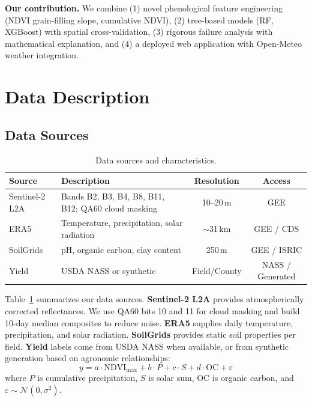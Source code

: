\documentclass[conference]{IEEEtran}
\begin{document}
\textbf{Our contribution.} We combine (1) novel phenological feature engineering (NDVI grain-filling slope, cumulative NDVI), (2) tree-based models (RF, XGBoost) with spatial cross-validation, (3) rigorous failure analysis with mathematical explanation, and (4) a deployed web application with Open-Meteo weather integration.

\section{Data Description}
\label{sec:data}

\subsection{Data Sources}

\begin{table}[t]
\centering
\caption{Data sources and characteristics.}
\label{tab:data_sources}
\begin{tabular}{@{}llcc@{}}
\toprule
Source & Description & Resolution & Access \\
\midrule
Sentinel-2 L2A & Bands B2, B3, B4, B8, B11, B12; QA60 cloud masking & 10--20\,m & GEE \\
ERA5 & Temperature, precipitation, solar radiation & $\sim$31\,km & GEE / CDS \\
SoilGrids & pH, organic carbon, clay content & 250\,m & GEE / ISRIC \\
Yield & USDA NASS or synthetic & Field/County & NASS / Generated \\
\bottomrule
\end{tabular}
\end{table}

Table~\ref{tab:data_sources} summarizes our data sources. \textbf{Sentinel-2 L2A} provides atmospherically corrected reflectances. We use QA60 bits 10 and 11 for cloud masking and build 10-day median composites to reduce noise. \textbf{ERA5} supplies daily temperature, precipitation, and solar radiation. \textbf{SoilGrids} provides static soil properties per field. \textbf{Yield} labels come from USDA NASS when available, or from synthetic generation based on agronomic relationships:
\begin{equation}
  y = a \cdot \text{NDVI}_{\max} + b \cdot P + c \cdot S + d \cdot \text{OC} + \varepsilon
\end{equation}
where $P$ is cumulative precipitation, $S$ is solar sum, OC is organic carbon, and $\varepsilon \sim \mathcal{N}(0, \sigma^2)$.
\end{document}
